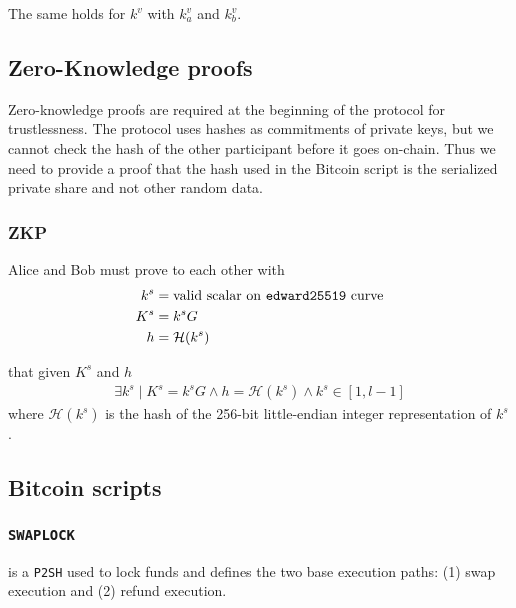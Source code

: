 \documentclass{llncs}
\begin{document}
The same holds for $k^v$ with $k^v_a$ and $k^v_b$.

\subsection{Zero-Knowledge proofs}
Zero-knowledge proofs are required at the beginning of the protocol for trustlessness. The protocol uses hashes as commitments of private keys, but we cannot check the hash of the other participant before it goes on-chain. Thus we need to provide a proof that the hash used in the Bitcoin script is the serialized private share and not other random data.

\subsubsection{ZKP}
Alice and Bob must prove to each other with
\begin{equation}
\begin{split}
    k^s &= \text{valid scalar on \texttt{edward25519} curve} \\
    K^s &= k^sG \\
    h &= \mathcal{H}(k^s) \\
\end{split}
\end{equation}

that given $K^s$ and $h$
\begin{equation}
\begin{split}
    \exists k^s \mid K^s = k^sG \land h = \mathcal{H}(k^s) \land k^s \in [1, l-1]
\end{split}
\end{equation}
where $\mathcal{H}(k^s)$ is the hash of the 256-bit little-endian integer representation of $k^s$.

\subsection{Bitcoin scripts}

\subsubsection{\texttt{SWAPLOCK}}
is a \texttt{P2SH} used to lock funds and defines the two base execution paths: (1) swap execution and (2) refund execution.
\end{document}
